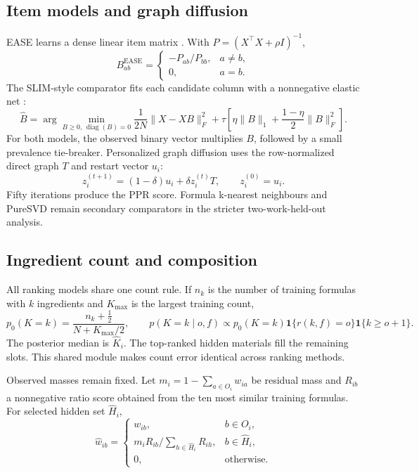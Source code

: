 \documentclass[11pt,a4paper]{article}
\begin{document}
\subsection{Item models and graph diffusion}

EASE learns a dense linear item matrix \citep{steck2019ease}. With $P=(X^{\top}X+\rho I)^{-1}$,
\begin{equation}
B^{\mathrm{EASE}}_{ab}=
\begin{cases}
-P_{ab}/P_{bb}, & a\ne b,\\
0, & a=b.
\end{cases}
\label{eq:ease}
\end{equation}
The SLIM-style comparator fits each candidate column with a nonnegative elastic net \citep{ning2011slim}:
\begin{equation}
\widehat B=\arg\min_{B\ge0,\,\operatorname{diag}(B)=0}
\frac{1}{2N}\lVert X-XB\rVert_F^2+
\tau\left[\eta\lVert B\rVert_1+\frac{1-\eta}{2}\lVert B\rVert_F^2\right].
\label{eq:slim}
\end{equation}
For both models, the observed binary vector multiplies $B$, followed by a small prevalence tie-breaker. Personalized graph diffusion uses the row-normalized direct graph $T$ and restart vector $u_i$:
\begin{equation}
z_i^{(t+1)}=(1-\delta)u_i+\delta z_i^{(t)}T,
\qquad z_i^{(0)}=u_i.
\label{eq:ppr}
\end{equation}
Fifty iterations produce the PPR score. Formula k-nearest neighbours and PureSVD remain secondary comparators in the stricter two-work-held-out analysis.

\subsection{Ingredient count and composition}

All ranking models share one count rule. If $n_k$ is the number of training formulas with $k$ ingredients and $K_{\max}$ is the largest training count,
\begin{equation}
p_0(K=k)=\frac{n_k+\tfrac12}{N+K_{\max}/2},\qquad
p(K=k\mid o,f)\propto p_0(K=k)\mathbf{1}\{r(k,f)=o\}\mathbf{1}\{k\ge o+1\}.
\label{eq:count}
\end{equation}
The posterior median is $\widehat K_i$. The top-ranked hidden materials fill the remaining slots. This shared module makes count error identical across ranking methods.

Observed masses remain fixed. Let $m_i=1-\sum_{a\in O_i}w_{ia}$ be residual mass and $R_{ib}$ a nonnegative ratio score obtained from the ten most similar training formulas. For selected hidden set $\widehat H_i$,
\begin{equation}
\widehat w_{ib}=
\begin{cases}
w_{ib}, & b\in O_i,\\[2pt]
m_i R_{ib}/\sum_{h\in\widehat H_i}R_{ih}, & b\in\widehat H_i,\\[2pt]
0, & \text{otherwise}.
\end{cases}
\label{eq:composition}
\end{equation}
\end{document}
